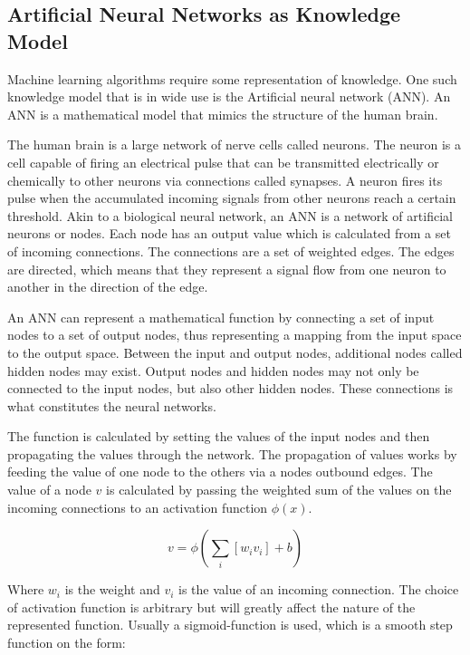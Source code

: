 \subsection{Artificial Neural Networks as Knowledge Model}
Machine learning algorithms require some representation of knowledge. One such knowledge model that is in wide use is the Artificial neural network (ANN). An ANN is a mathematical model that mimics the structure of the human brain. 

The human brain is a large network of nerve cells called neurons. The neuron is a cell capable of firing an electrical pulse that can be transmitted electrically or chemically to other neurons via connections called synapses. A neuron fires its pulse when the accumulated incoming signals from other neurons reach a certain threshold. Akin to a biological neural network, an ANN is a network of artificial neurons or nodes. Each node has an output value which is calculated from a set of incoming connections. The connections are a set of weighted edges. The edges are directed, which means that they represent a signal flow from one neuron to another in the direction of the edge.

An ANN can represent a mathematical function by connecting a set of input nodes to a set of output nodes, thus representing a mapping from the input space to the output space. Between the input and output nodes, additional nodes called hidden nodes may exist. Output nodes and hidden nodes may not only be connected to the input nodes, but also other hidden nodes. These connections is what constitutes the neural networks. 

The function is calculated by setting the values of the input nodes and then propagating the values through the network. The propagation of values works by feeding the value of one node to the others via a nodes outbound edges. The value of a node $v$ is calculated by passing the weighted sum of the values on the incoming connections to an activation function $\phi(x)$.

\begin{equation}
    v = \phi (\sum_i{[w_i v_i]} + b)
\end{equation}

\noindent
Where $w_i$ is the weight and $v_i$ is the value of an incoming connection. The choice of activation function is arbitrary but will greatly affect the nature of the represented function. Usually a sigmoid-function is used, which is a smooth step function on the form:

